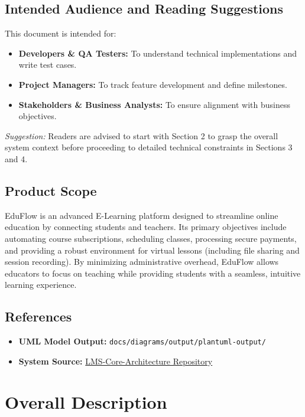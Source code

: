 \documentclass[11pt,a4paper]{article}
\begin{document}
\subsection{Intended Audience and Reading Suggestions}
This document is intended for:
\begin{itemize}
    \item \textbf{Developers \& QA Testers:} To understand technical implementations and write test cases.
    \item \textbf{Project Managers:} To track feature development and define milestones.
    \item \textbf{Stakeholders \& Business Analysts:} To ensure alignment with business objectives.
\end{itemize}
\textit{Suggestion:} Readers are advised to start with Section 2 to grasp the overall system context before proceeding to detailed technical constraints in Sections 3 and 4.

\subsection{Product Scope}
EduFlow is an advanced E-Learning platform designed to streamline online education by connecting students and teachers. Its primary objectives include automating course subscriptions, scheduling classes, processing secure payments, and providing a robust environment for virtual lessons (including file sharing and session recording). By minimizing administrative overhead, EduFlow allows educators to focus on teaching while providing students with a seamless, intuitive learning experience.

\subsection{References}
\begin{itemize}
    \item \textbf{UML Model Output:} \texttt{docs/diagrams/output/plantuml-output/}
    \item \textbf{System Source:} \href{https://github.com/MoUmen-A/LMS-Core-Architecture}{LMS-Core-Architecture Repository}
\end{itemize}

\section{Overall Description}
\end{document}
